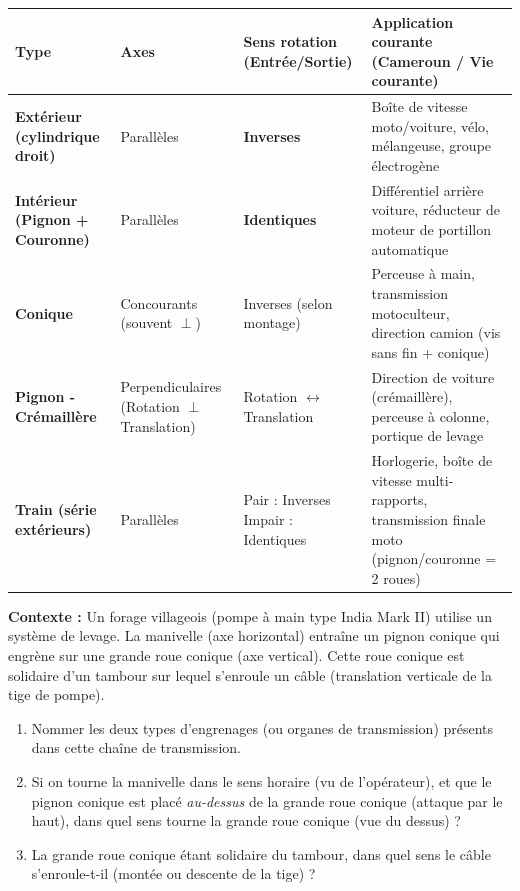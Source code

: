 \documentclass[11pt]{article}
\newcounter{popsec}
\newcounter{popsub}
\newcommand{\courssub}[1]{%
  \stepcounter{popsub}%
  \par\vspace{9pt}\noindent{\popxbold\fontsize{11.5}{13}\selectfont\color{popink}{\color{poporange}\thepopsec.\thepopsub}\hspace{6pt}#1}\par\nopagebreak\vspace{4pt}
}
\begin{document}
\courssub{Synthèse des types d'engrenages}

\begin{center}
\begin{tabularx}{\linewidth}{|l|X|X|X|}\hline
\rowcolor{popblueL}
\textbf{Type} & \textbf{Axes} & \textbf{Sens rotation (Entrée/Sortie)} & \textbf{Application courante (Cameroun / Vie courante)} \\ \hline
\textbf{Extérieur (cylindrique droit)} & Parallèles & \textbf{Inverses} & Boîte de vitesse moto/voiture, vélo, mélangeuse, groupe électrogène \\ \hline
\textbf{Intérieur (Pignon + Couronne)} & Parallèles & \textbf{Identiques} & Différentiel arrière voiture, réducteur de moteur de portillon automatique \\ \hline
\textbf{Conique} & Concourants (souvent $\perp$) & Inverses (selon montage) & Perceuse à main, transmission motoculteur, direction camion (vis sans fin + conique) \\ \hline
\textbf{Pignon - Crémaillère} & Perpendiculaires (Rotation $\perp$ Translation) & Rotation $\leftrightarrow$ Translation & Direction de voiture (crémaillère), perceuse à colonne, portique de levage \\ \hline
\textbf{Train (série extérieurs)} & Parallèles & Pair : Inverses \newline Impair : Identiques & Horlogerie, boîte de vitesse multi-rapports, transmission finale moto (pignon/couronne = 2 roues) \\ \hline
\end{tabularx}
\end{center}

\begin{exercice}
\textbf{Contexte :} Un forage villageois (pompe à main type India Mark II) utilise un système de levage. La manivelle (axe horizontal) entraîne un pignon conique qui engrène sur une grande roue conique (axe vertical). Cette roue conique est solidaire d'un tambour sur lequel s'enroule un câble (translation verticale de la tige de pompe).
\begin{enumerate}
\item Nommer les deux types d'engrenages (ou organes de transmission) présents dans cette chaîne de transmission.
\item Si on tourne la manivelle dans le sens horaire (vu de l'opérateur), et que le pignon conique est placé \emph{au-dessus} de la grande roue conique (attaque par le haut), dans quel sens tourne la grande roue conique (vue du dessus) ?
\item La grande roue conique étant solidaire du tambour, dans quel sens le câble s'enroule-t-il (montée ou descente de la tige) ?
\end{enumerate}
\end{exercice}
\end{document}
